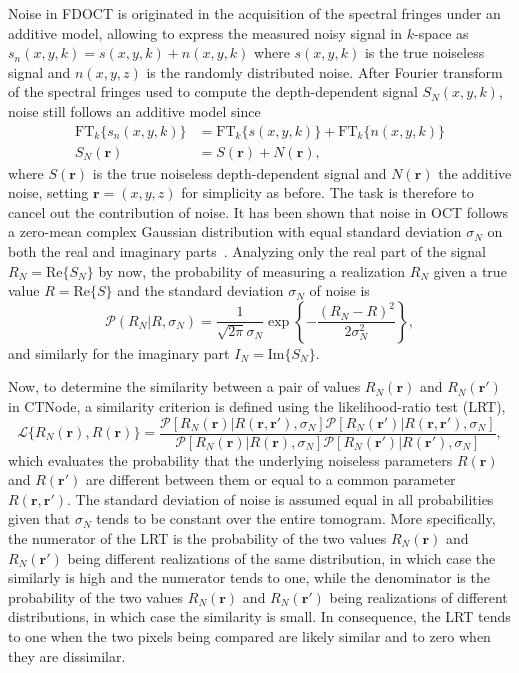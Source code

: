 Noise in FDOCT is originated in the acquisition of the spectral fringes under an additive model, allowing to express the measured noisy signal in $k$-space as $s_n(x,y,k) = s(x,y,k) + n(x,y,k)$ where $s(x,y,k)$ is the true noiseless signal and $n(x,y,z)$ is the randomly distributed noise. After Fourier transform of the spectral fringes used to compute the depth-dependent signal $S_N(x,y,k)$, noise still follows an additive model since
\begin{align}
    \text{FT}_k\{s_n(x,y,k)\} &= \text{FT}_k\{s(x,y,k)\} + \text{FT}_k\{n(x,y,k)\} \nonumber\\
    S_N(\mathbf{r}) &= S(\mathbf{r}) + N(\mathbf{r}),
\end{align}
where $S(\mathbf{r})$ is the true noiseless depth-dependent signal and $N(\mathbf{r})$ the additive noise, setting $\mathbf{r} = (x,y,z)$ for simplicity as before. The task is therefore to cancel out the contribution of noise. It has been shown that noise in OCT follows a zero-mean complex Gaussian distribution with equal standard deviation $\sigma_N$ on both the real and imaginary parts~\cite{Makita2016_Noiseimmune, Uribe-Patarroyo2020_Noise}. Analyzing only the real part of the signal $R_N = \text{Re}\{S_N\}$ by now, the probability of measuring a realization $R_N$ given a true value $R = \text{Re}\{S\}$ and the standard deviation $\sigma_N$ of noise is~\cite{Deledalle2012_How}
\begin{equation}\label{eq:GaussianProb}
    \mathcal{P}(R_N|R, \sigma_N) = \frac{1}{\sqrt{2\pi}\sigma_N} \exp\left\{-\frac{(R_N-R) ^ 2} {2\sigma_N^2}\right\},
\end{equation}
and similarly for the imaginary part $I_N = \text{Im}\{S_N\}$.

Now, to determine the similarity between a pair of values $R_N(\bm{r})$ and $R_N(\bm{r}')$ in CTNode, a similarity criterion is defined using the likelihood-ratio test (LRT),
\begin{equation}
    \mathcal{L}\{R_N(\bm{r}), R(\bm{r})\} = \frac{\mathcal{P}[R_N(\bm{r})|R(\bm{r},\bm{r}'), \sigma_N] \mathcal{P}[R_N(\bm{r}')|R(\bm{r},\bm{r}'), \sigma_N]} {\mathcal{P}[R_N(\bm{r})|R(\bm{r}), \sigma_N] \mathcal{P}[R_N(\bm{r}')|R(\bm{r}'), \sigma_N]},
\end{equation}
which evaluates the probability that the underlying noiseless parameters $R(\bm{r})$ and $R(\bm{r}')$ are different between them or equal to a common parameter $R(\bm{r}, \bm{r}')$. The standard deviation of noise is assumed equal in all probabilities given that $\sigma_N$ tends to be constant over the entire tomogram. More specifically, the numerator of the LRT is the probability of the two values $R_N(\bm{r})$ and $R_N(\bm{r}')$ being different realizations of the same distribution, in which case the similarly is high and the numerator tends to one, while the denominator is the probability of the two values $R_N(\bm{r})$ and $R_N(\bm{r}')$ being realizations of different distributions, in which case the similarity is small. In consequence, the LRT tends to one when the two pixels being compared are likely similar and to zero when they are dissimilar.

